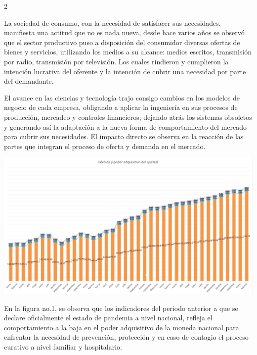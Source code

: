 \documentclass[12pt,spanish,Letterpaper,openany]{book}
\begin{document}
\begin {multicols}{2}

La sociedad de consumo, con la necesidad de satisfacer sus necesidades, manifiesta una actitud que no es nada nueva, desde hace varios años se observó que el sector productivo puso a disposición del consumidor diversas ofertas de bienes y servicios, utilizando los medios a su alcance: medios escritos, transmisión por radio, transmisión por televisión. Los cuales rindieron y cumplieron la intención lucrativa del oferente y la intención de cubrir una necesidad por parte del demandante.

El avance en las ciencias y tecnología trajo consigo cambios en los modelos de negocio de cada empresa, obligando a aplicar la ingeniería en sus procesos de producción, mercadeo y controles financieros; dejando atrás los sistemas obsoletos y generando así la adaptación a la nueva forma de comportamiento del mercado para cubrir sus necesidades. El impacto directo se observa en la reacción de las partes que integran el proceso de oferta y demanda en el mercado.

\begin {flushleft}
\noindent\begin{minipage}[c]{\columnwidth}
\centering

\includegraphics[width=1\linewidth]{images/pareja25_image2}

\end{minipage}
\end {flushleft}

En la figura no.1, se observa que los indicadores del periodo anterior a que se declare oficialmente el estado de pandemia a nivel nacional, refleja el comportamiento a la baja en el poder adquisitivo de la moneda nacional para enfrentar la necesidad de prevención, protección y en caso de contagio el proceso curativo a nivel familiar y hospitalario.


\end{multicols}
\end{document}
